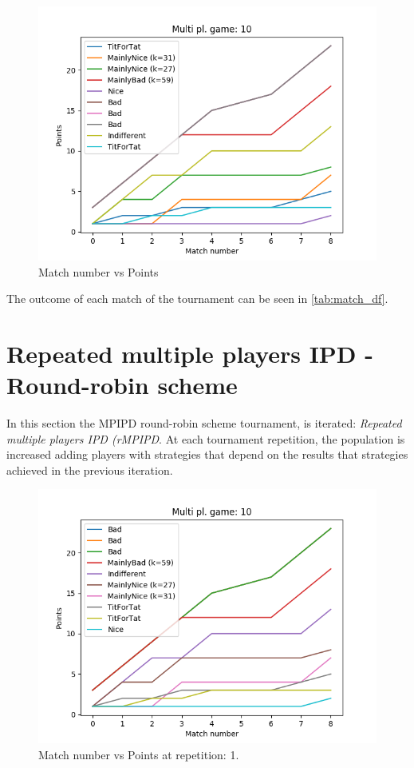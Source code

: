 \documentclass[journal,a4paper,10pt,twoside]{IEEEtran}
\begin{document}
\begin{figure}
    \centering
    \includegraphics[width=1\columnwidth]{../img_v1/idpmp-scores-10.png}
    \caption{Match number vs Points}
    \label{fig:mpipd}
\end{figure}


The outcome of each match of the tournament can be seen in \autoref{tab:match_df}.

\newpage
\section{Repeated multiple players IPD - Round-robin scheme} \label{rIPDMP}
In this section the MPIPD round-robin scheme tournament, is iterated: \textit{Repeated multiple players IPD (rMPIPD}.
At each tournament repetition, the population is increased adding players with strategies that depend on the results that strategies achieved in the previous iteration. 

\begin{figure}
    \centering
    \includegraphics[width=1\columnwidth]{../img_v1/ridpmp-scores-10-r0.png}
    \caption{Match number vs Points at repetition: 1.}
    \label{fig:rmpipd1}
\end{figure}
\end{document}

